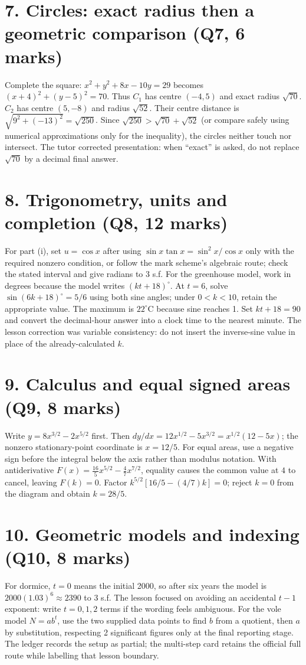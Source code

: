 \documentclass[10pt,a4paper]{article}
\begin{document}
\section*{7. Circles: exact radius then a geometric comparison (Q7, 6 marks)}
Complete the square: $x^2+y^2+8x-10y=29$ becomes $(x+4)^2+(y-5)^2=70$. Thus $C_1$ has centre $(-4,5)$ and exact radius $\sqrt{70}$. $C_2$ has centre $(5,-8)$ and radius $\sqrt{52}$. Their centre distance is $\sqrt{9^2+(-13)^2}=\sqrt{250}$. Since $\sqrt{250}>\sqrt{70}+\sqrt{52}$ (or compare safely using numerical approximations only for the inequality), the circles neither touch nor intersect. The tutor corrected presentation: when ``exact'' is asked, do not replace $\sqrt{70}$ by a decimal final answer.\section*{8. Trigonometry, units and completion (Q8, 12 marks)}
For part (i), set $u=\cos x$ after using $\sin x\tan x=\sin^2x/\cos x$ only with the required nonzero condition, or follow the mark scheme's algebraic route; check the stated interval and give radians to 3 s.f. For the greenhouse model, work in degrees because the model writes $(kt+18)^\circ$. At $t=6$, solve $\sin(6k+18)^\circ=5/6$ using both sine angles; under $0<k<10$, retain the appropriate value. The maximum is $22^\circ\mathrm C$ because sine reaches 1. Set $kt+18=90$ and convert the decimal-hour answer into a clock time to the nearest minute. The lesson correction was variable consistency: do not insert the inverse-sine value in place of the already-calculated $k$.\section*{9. Calculus and equal signed areas (Q9, 8 marks)}
Write $y=8x^{3/2}-2x^{5/2}$ first. Then $dy/dx=12x^{1/2}-5x^{3/2}=x^{1/2}(12-5x)$; the nonzero stationary-point coordinate is $x=12/5$. For equal areas, use a negative sign before the integral below the axis rather than modulus notation. With antiderivative $F(x)=\frac{16}{5}x^{5/2}-\frac47x^{7/2}$, equality causes the common value at $4$ to cancel, leaving $F(k)=0$. Factor $k^{5/2}[16/5-(4/7)k]=0$; reject $k=0$ from the diagram and obtain $k=28/5$.\section*{10. Geometric models and indexing (Q10, 8 marks)}
For dormice, $t=0$ means the initial 2000, so after six years the model is $2000(1.03)^6\approx2390$ to 3 s.f. The lesson focused on avoiding an accidental $t-1$ exponent: write $t=0,1,2$ terms if the wording feels ambiguous. For the vole model $N=ab^t$, use the two supplied data points to find $b$ from a quotient, then $a$ by substitution, respecting 2 significant figures only at the final reporting stage. The ledger records the setup as partial; the multi-step card retains the official full route while labelling that lesson boundary.\newpage
\end{document}

